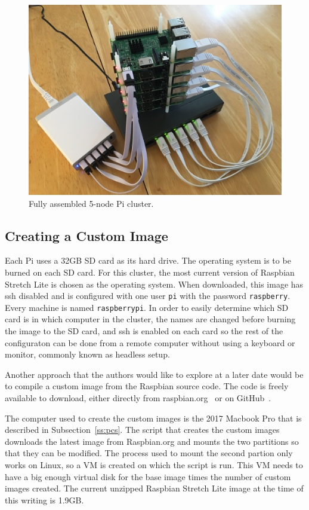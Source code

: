 \begin{figure}[!ht]
  \centering\includegraphics[width=\columnwidth]{images/complete-pi-cluster.jpg}
  \caption{Fully assembled 5-node Pi cluster.}\label{f:complete-cluster}
\end{figure}

\subsection{Creating a Custom Image}
Each Pi uses a 32GB SD card as its hard drive. The operating system is
to be burned on each SD card. For this cluster, the most current
version of Raspbian Stretch Lite is chosen as the operating
system. When downloaded, this image has ssh disabled and is configured
with one user \verb|pi| with the password \verb|raspberry|. Every
machine is named \verb|raspberrypi|. In order to easily determine
which SD card is in which computer in the cluster, the names are
changed before burning the image to the SD card, and ssh is enabled on
each card so the rest of the configuraton can be done from a remote
computer without using a keyboard or monitor, commonly known as
headless setup.

Another approach that the authors would like to explore at a later
date would be to compile a custom image from the Raspbian source
code. The code is freely available to download, either directly from
raspbian.org~\cite{hid-sp18-419-raspbian-distro} or on
GitHub~\cite{hid-sp18-419-pi-gen}.

The computer used to create the custom images is the 2017 Macbook Pro
that is described in Subsection~\ref{ss:pcs}. The script that creates
the custom images downloads the latest image from Raspbian.org and
mounts the two partitions so that they can be modified. The process
used to mount the second partion only works on Linux, so a VM is
created on which the script is run. This VM needs to have a big enough
virtual disk for the base image times the number of custom images
created. The current unzipped Raspbian Stretch Lite image at the time
of this writing is 1.9GB.

